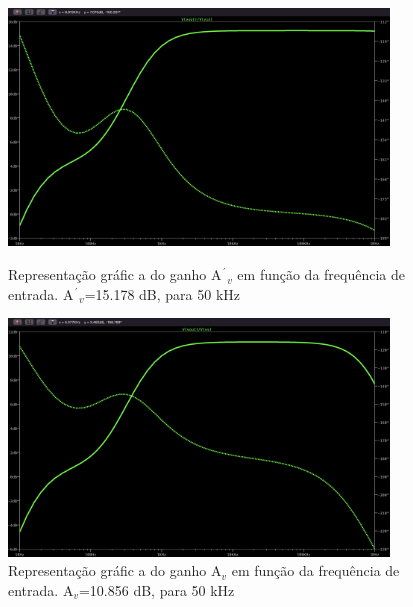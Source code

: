\documentclass[a4paper,12pt]{article}
\begin{document}
				\begin{figure}[H]
    					\centering
    					\begin{minipage}{0.45\textwidth}
        					\centering
        					\includegraphics[width=0.9\textwidth]{4.3-3.png} %
        					\caption{Representação gráfic  a do ganho A$^´$$_{v}$ em função da frequência de entrada. A$^´$$_{v}$=15.178 dB, para 50 kHz}
    					\end{minipage}\hfill
    					\begin{minipage}{0.45\textwidth}
        					\centering
        					\includegraphics[width=0.9\textwidth]{4.3-4.png} %
        					\caption{Representação gráfic  a do ganho A$_{v}$ em função da frequência de entrada. A$_{v}$=10.856 dB, para 50 kHz}
    						\end{minipage}
				\end{figure}
\end{document}
